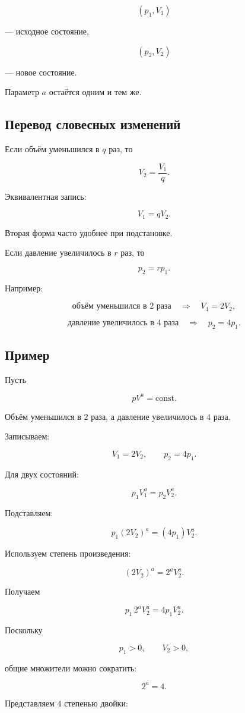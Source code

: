 \documentclass[a4paper,12pt]{article}
\newcommand{\subsect}[1]{%
  \subsection*{\color{accent}#1}%
}
\begin{document}
\[
(p_1,V_1)
\]

--- исходное состояние,

\[
(p_2,V_2)
\]

--- новое состояние.

Параметр $a$ остаётся одним и тем же.


\subsect{Перевод словесных изменений}

Если объём уменьшился в $q$ раз, то

\[
V_2
=
\frac{V_1}{q}.
\]

Эквивалентная запись:

\[
V_1=qV_2.
\]

Вторая форма часто удобнее при подстановке.

Если давление увеличилось в $r$ раз, то

\[
p_2=rp_1.
\]

Например:

\[
\text{объём уменьшился в 2 раза}
\quad\Longrightarrow\quad
V_1=2V_2,
\]

\[
\text{давление увеличилось в 4 раза}
\quad\Longrightarrow\quad
p_2=4p_1.
\]


\subsect{Пример}

Пусть

\[
pV^a=\mathrm{const}.
\]

Объём уменьшился в $2$ раза,
а давление увеличилось в $4$ раза.

Записываем:

\[
V_1=2V_2,
\qquad
p_2=4p_1.
\]

Для двух состояний:

\[
p_1V_1^a
=
p_2V_2^a.
\]

Подставляем:

\[
p_1(2V_2)^a
=
(4p_1)V_2^a.
\]

Используем степень произведения:

\[
(2V_2)^a
=
2^aV_2^a.
\]

Получаем

\[
p_1\,2^aV_2^a
=
4p_1V_2^a.
\]

Поскольку

\[
p_1>0,
\qquad
V_2>0,
\]

общие множители можно сократить:

\[
2^a=4.
\]

Представляем $4$ степенью двойки:
\end{document}
